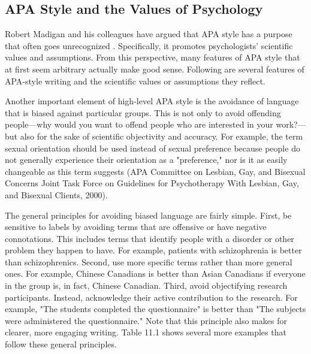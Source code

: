 \subsection{APA Style and the Values of Psychology}

Robert Madigan and his colleagues have argued that APA style has a purpose that often goes unrecognized \citep{madigan_language_1995}. Specifically, it promotes psychologists' scientific values and assumptions. From this perspective, many features of APA style that at first seem arbitrary actually make good sense. Following are several features of APA-style writing and the scientific values or assumptions they reflect.

Another important element of high-level APA style is the avoidance of language that is biased against particular groups. This is not only to avoid offending people---why would you want to offend people who are interested in your work?---but also for the sake of scientific objectivity and accuracy. For example, the term sexual orientation should be used instead of sexual preference because people do not generally experience their orientation as a "preference," nor is it as easily changeable as this term suggests (APA Committee on Lesbian, Gay, and Bisexual Concerns Joint Task Force on Guidelines for Psychotherapy With Lesbian, Gay, and Bisexual Clients, 2000).


The general principles for avoiding biased language are fairly simple. First, be sensitive to labels by avoiding terms that are offensive or have negative connotations. This includes terms that identify people with a disorder or other problem they happen to have. For example, patients with schizophrenia is better than schizophrenics. Second, use more specific terms rather than more general ones. For example, Chinese Canadians is better than Asian Canadians if everyone in the group is, in fact, Chinese Canadian. Third, avoid objectifying research participants. Instead, acknowledge their active contribution to the research. For example, "The students completed the questionnaire" is better than "The subjects were administered the questionnaire." Note that this principle also makes for clearer, more engaging writing. Table 11.1 shows several more examples that follow these general principles.



